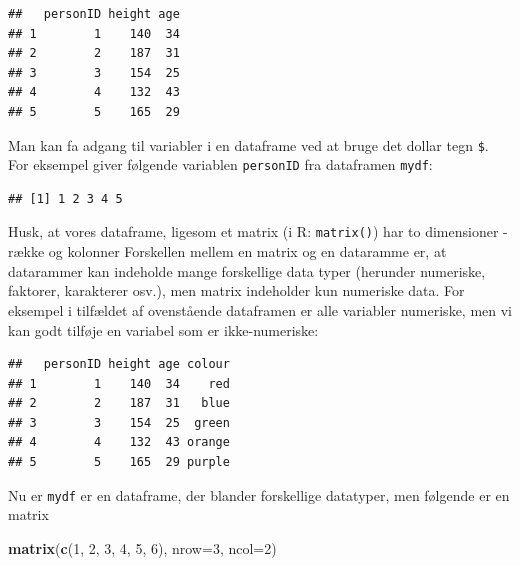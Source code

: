 \documentclass[
]{book}
\newenvironment{Shaded}{\begin{snugshade}}{\end{snugshade}}
\newcommand{\AttributeTok}[1]{\textcolor[rgb]{0.13,0.29,0.53}{#1}}
\newcommand{\CommentTok}[1]{\textcolor[rgb]{0.56,0.35,0.01}{\textit{#1}}}
\newcommand{\DecValTok}[1]{\textcolor[rgb]{0.00,0.00,0.81}{#1}}
\newcommand{\FunctionTok}[1]{\textcolor[rgb]{0.13,0.29,0.53}{\textbf{#1}}}
\newcommand{\NormalTok}[1]{#1}
\newcommand{\OtherTok}[1]{\textcolor[rgb]{0.56,0.35,0.01}{#1}}
\newcommand{\SpecialCharTok}[1]{\textcolor[rgb]{0.81,0.36,0.00}{\textbf{#1}}}
\newcommand{\StringTok}[1]{\textcolor[rgb]{0.31,0.60,0.02}{#1}}
\begin{document}
\begin{verbatim}
##   personID height age
## 1        1    140  34
## 2        2    187  31
## 3        3    154  25
## 4        4    132  43
## 5        5    165  29
\end{verbatim}

Man kan fa adgang til variabler i en dataframe ved at bruge det dollar tegn \texttt{\$}. For eksempel giver følgende variablen \texttt{personID} fra dataframen \texttt{mydf}:

\begin{Shaded}
\end{Shaded}

\begin{verbatim}
## [1] 1 2 3 4 5
\end{verbatim}

Husk, at vores dataframe, ligesom et matrix (i R: \texttt{matrix()}) har to dimensioner - række og kolonner Forskellen mellem en matrix og en dataramme er, at datarammer kan indeholde mange forskellige data typer (herunder numeriske, faktorer, karakterer osv.), men matrix indeholder kun numeriske data. For eksempel i tilfældet af ovenstående dataframen er alle variabler numeriske, men vi kan godt tilføje en variabel som er ikke-numeriske:

\begin{Shaded}
\end{Shaded}

\begin{verbatim}
##   personID height age colour
## 1        1    140  34    red
## 2        2    187  31   blue
## 3        3    154  25  green
## 4        4    132  43 orange
## 5        5    165  29 purple
\end{verbatim}

Nu er \texttt{mydf} er en dataframe, der blander forskellige datatyper, men følgende er en matrix

\begin{Shaded}
\begin{Highlighting}[]
\FunctionTok{matrix}\NormalTok{(}\FunctionTok{c}\NormalTok{(}\DecValTok{1}\NormalTok{, }\DecValTok{2}\NormalTok{, }\DecValTok{3}\NormalTok{, }\DecValTok{4}\NormalTok{, }\DecValTok{5}\NormalTok{, }\DecValTok{6}\NormalTok{), }
    \AttributeTok{nrow=}\DecValTok{3}\NormalTok{,}
    \AttributeTok{ncol=}\DecValTok{2}\NormalTok{)}
\end{Highlighting}
\end{Shaded}
\end{document}

